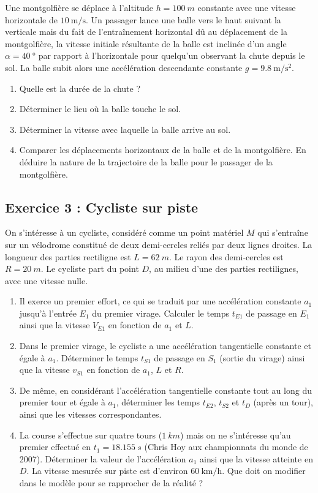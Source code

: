 Une montgolfière se déplace à l'altitude $h = \SI{100}{m}$ constante avec une vitesse horizontale de $\SI{10}{\meter\per\second}$. Un passager lance une balle vers le haut suivant la verticale mais du fait de l’entraînement horizontal dû au déplacement de la montgolfière, la vitesse initiale résultante de la balle est inclinée d’un angle $\alpha = \SI{40}{\degree}$ par rapport à l’horizontale pour quelqu’un observant la chute depuis le sol. La balle subit alors une accélération descendante constante $g = \SI{9.8}{\meter\per\second\squared}$.

\begin{enumerate}
	\item Quelle est la durée de la chute ?
	\item Déterminer le lieu où la balle touche le sol.
	\item Déterminer la vitesse avec laquelle la balle arrive au sol.
	\item Comparer les déplacements horizontaux de la balle et de la montgolfière. En déduire la nature de la trajectoire de la balle pour le passager de la montgolfière.
\end{enumerate}

\subsection{Exercice 3 : Cycliste sur piste}

On s'intéresse à un cycliste, considéré comme un point matériel $M$ qui s'entraîne sur un vélodrome constitué de deux demi-cercles reliés par deux lignes droites. La longueur des parties rectiligne est $L = \SI{62}{m}$. Le rayon des demi-cercles est $R = \SI{20}{m}$. Le cycliste part du point $D$, au milieu d'une des parties rectilignes, avec une vitesse nulle.

\begin{enumerate}
	\item Il exerce un premier effort, ce qui se traduit par une accélération constante $a_1$ jusqu'à l'entrée $E_1$ du premier virage. Calculer le temps $t_{E1}$ de passage en $E_1$ ainsi que la vitesse $V_{E1}$ en fonction de $a_1$ et $L$.
	\item Dans le premier virage, le cycliste a une accélération tangentielle constante et égale à $a_1$. Déterminer le temps $t_{S1}$ de passage en $S_1$ (sortie du virage) ainsi que la vitesse $v_{S1}$ en fonction de $a_1$, $L$ et $R$.
	\item De même, en considérant l'accélération tangentielle constante tout au long du premier tour et égale à $a_1$, déterminer les temps $t_{E2}$, $t_{S2}$ et $t_D$ (après un tour), ainsi que les vitesses correspondantes.
	\item La course s'effectue sur quatre tours ($\SI{1}{km}$) mais on ne s'intéresse qu'au premier effectué en $t_1 = \SI{18.155}{s}$ (Chris Hoy aux championnats du monde de 2007). Déterminer la valeur de l'accélération $a_1$ ainsi que la vitesse atteinte en $D$. La vitesse mesurée sur piste est d'environ $\SI{60}{\km\per\hour}$. Que doit on modifier dans le modèle pour se rapprocher de la réalité ?
\end{enumerate}


